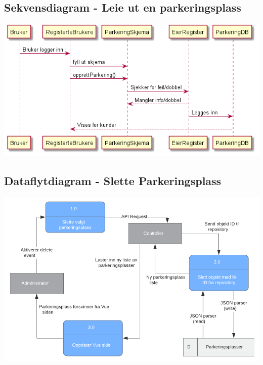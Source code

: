 \documentclass[12pt]{article}
\begin{document}
    \subsection{Sekvensdiagram - Leie ut en parkeringsplass}
    \includegraphics[max width=\textwidth]{bilder/diagrammer/sekvens_legge_ut_parkering.png}

    \subsection{Dataflytdiagram - Slette Parkeringsplass}
    \includegraphics[max width=\textwidth]{bilder/diagrammer/dataflyt_sletting.png}
\end{document}
